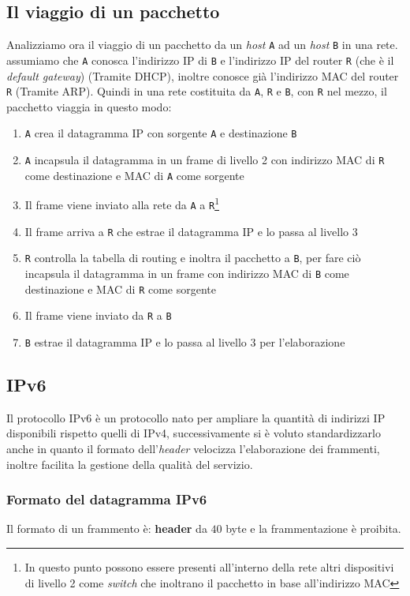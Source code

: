     \subsection{Il viaggio di un pacchetto}
        Analizziamo ora il viaggio di un pacchetto da un \textit{host} \texttt{A} ad un \textit{host} \texttt{B} in una rete. assumiamo che \texttt{A} conosca l'indirizzo \Acrshort*{IP} di \texttt{B} e l'indirizzo \Acrshort*{IP} del router \texttt{R} (che è il \textit{default gateway}) (Tramite \Acrshort*{DHCP}), inoltre conosce già l'indirizzo \Acrshort*{MAC} del router \texttt{R} (Tramite \Acrshort*{ARP}).\newline
        Quindi in una rete costituita da \texttt{A}, \texttt{R} e \texttt{B}, con \texttt{R} nel mezzo, il pacchetto viaggia in questo modo: \begin{enumerate}
            \item \texttt{A} crea il datagramma \Acrshort*{IP} con sorgente \texttt{A} e destinazione \texttt{B}
            \item \texttt{A} incapsula il datagramma in un frame di livello 2 con indirizzo \Acrshort*{MAC} di \texttt{R} come destinazione e \Acrshort*{MAC} di \texttt{A} come sorgente
            \item Il frame viene inviato alla rete da \texttt{A} a \texttt{R}\footnote{\label{netSwitch}
                In questo punto possono essere presenti all'interno della rete altri dispositivi di livello 2 come \textit{switch} che inoltrano il pacchetto in base all'indirizzo \Acrshort*{MAC}}
            \item Il frame arriva a \texttt{R} che estrae il datagramma \Acrshort*{IP} e lo passa al livello 3
            \item \texttt{R} controlla la tabella di routing e inoltra il pacchetto a \texttt{B}, per fare ciò incapsula il datagramma in un frame con indirizzo \Acrshort*{MAC} di \texttt{B} come destinazione e \Acrshort*{MAC} di \texttt{R} come sorgente
            \item Il frame viene inviato da \texttt{R} a \texttt{B}
            \item \texttt{B} estrae il datagramma \Acrshort*{IP} e lo passa al livello 3 per l'elaborazione
        \end{enumerate}
    \subsection[Internet Protocol version 6(\texttt{IPv6})]{\Acrfull*{IPv6}}
        Il protocollo \Acrshort*{IPv6} è un protocollo nato per ampliare la quantità di indirizzi \Acrshort*{IP} disponibili rispetto quelli di \Acrshort*{IPv4}, successivamente si è voluto standardizzarlo anche in quanto il formato dell'\textit{header} velocizza l'elaborazione dei frammenti, inoltre facilita la gestione della qualità del servizio.\subsubsection{Formato del datagramma \Acrshort*{IPv6}}
            Il formato di un frammento è: \textbf{header} da $40$ byte e la frammentazione è proibita.
